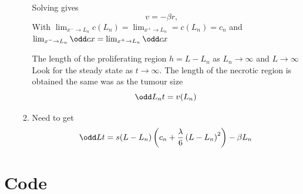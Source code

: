 \documentclass{X:/Documents/Coding/Latex/myassignment}
\begin{document}
\begin{enumerate}
\begin{enumerate}
		Solving gives
		\[v = - \beta r, \quad \]
		With $\lim_{x^- \to L_n}  c(L_n) =\lim_{x^+ \to L_n} = c(L_n) = c_n$ and $\lim_{x^- \to L_n} \odd c x = \lim _{x^+\to L_n}\odd cx$

		The length of the proliferating region $h = L - L_n$  as $L_n \to \infty$ and $L \to \infty$
		Look for the steady state as $t\to \infty$.
		The length of the necrotic region is obtained the same was as the tumour size 
		\[\odd L_n t = v(L_n)\]

		\item 

		Need to get
		\[\odd Lt = s(L - L_n) \left(c_n + \frac \lambda 6 \left(L - L_n\right)^2 \right) - \beta L_n\]
	\end{enumerate}
\end{enumerate}




\section*{Code}



\end{document}
